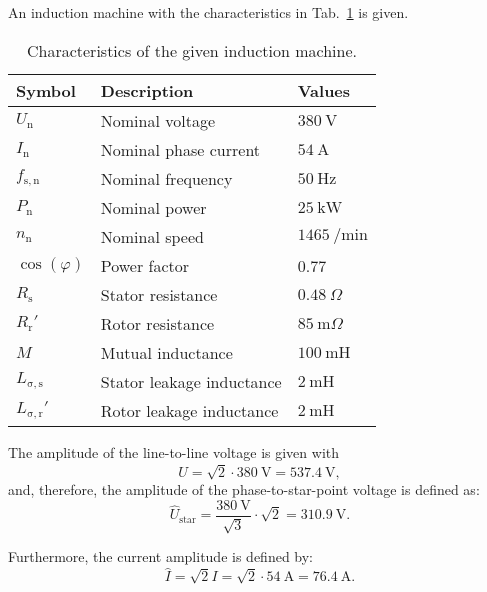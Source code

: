 
An induction machine with the characteristics in Tab.~\ref{tab:characteristicsIM_task2} is given.
\begin{table}[htb]
    \caption{Characteristics of the given induction machine.}
    \centering
    \begin{tabular}{lll}\toprule
    Symbol  & Description       & Values \\
    \midrule
    $U_{\mathrm{n}}$    & Nominal voltage           & $\SI{380}{\volt}$ \\
    $I_{\mathrm{n}}$    & Nominal phase current     & $\SI{54}{\ampere}$ \\
    $f_{\mathrm{s,n}}$  & Nominal frequency         & $\SI{50}{\hertz}$ \\
    $P_{\mathrm{n}}$    & Nominal power             & $\SI{25}{\kilo\watt}$ \\
    $n_{\mathrm{n}}$    & Nominal speed             & $\SI{1465}{\per\minute}$ \\
    $\cos(\varphi)$     & Power factor              & 0.77 \\
    \midrule
    $R_{\mathrm{s}}$    & Stator resistance         & $\SI{0.48}{\Omega}$ \\
    $R_{\mathrm{r}}'$    & Rotor resistance          & $\SI{85}{\milli\Omega}$ \\
    $M$                 & Mutual inductance         & $\SI{100}{\milli\henry}$ \\
    $L_{\mathrm{\sigma,s}}$    & Stator leakage inductance  & $\SI{2}{\milli\henry}$ \\
    $L_{\mathrm{\sigma,r}}'$    & Rotor leakage inductance   & $\SI{2}{\milli\henry}$ \\
    \bottomrule
    \end{tabular}
    \label{tab:characteristicsIM_task2}
\end{table}



\begin{solutionblock}
    The amplitude of the line-to-line voltage is given with
    \begin{equation}
    \hat{U} = \sqrt{2}\cdot \SI{380}{\volt}
    = \SI{537.4}{\volt},
    \end{equation}
    and, therefore, the amplitude of the phase-to-star-point voltage is defined as:
    \begin{equation}
    \hat{U}_{\mathrm{star}} = \frac{\SI{380}{\volt}}{\sqrt{3}}\cdot \sqrt{2} = \SI{310.9}{\volt}.
    \end{equation}

    Furthermore, the current amplitude is defined by:
    \begin{equation}
        \hat{I} = \sqrt{2} I = \sqrt{2} \cdot \SI{54}{\ampere} = \SI{76.4}{\ampere}.
    \end{equation}
\end{solutionblock}

